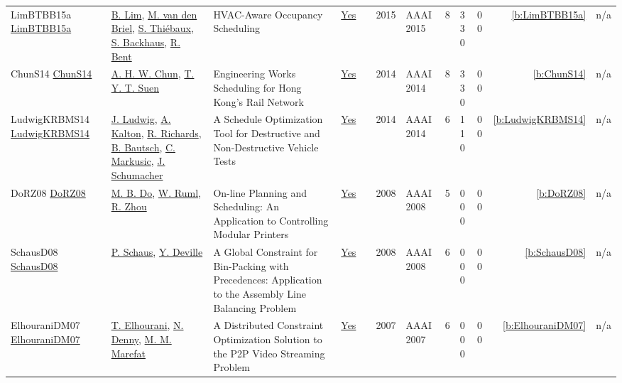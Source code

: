 {\begin{longtable}{>{\raggedright\arraybackslash}p{3cm}>{\raggedright\arraybackslash}p{4.5cm}>{\raggedright\arraybackslash}p{6.0cm}rrrp{2.5cm}rp{1cm}p{1cm}rr}
LimBTBB15a \href{https://doi.org/10.1609/aaai.v29i1.9236}{LimBTBB15a} & \hyperref[auth:a207]{B. Lim}, \hyperref[auth:a210]{M. van den Briel}, \hyperref[auth:a209]{S. Thi{\'{e}}baux}, \hyperref[auth:a1356]{S. Backhaus}, \hyperref[auth:a1355]{R. Bent} & HVAC-Aware Occupancy Scheduling & \href{../works/LimBTBB15a.pdf}{Yes} & \cite{LimBTBB15a} & 2015 & AAAI 2015 & 8 & 3 3 0 & 0 0 & \ref{b:LimBTBB15a} & n/a\\
ChunS14 \href{https://doi.org/10.1609/aaai.v28i2.19013}{ChunS14} & \hyperref[auth:a1323]{A. H. W. Chun}, \hyperref[auth:a1373]{T. Y. T. Suen} & Engineering Works Scheduling for Hong Kong's Rail Network & \href{../works/ChunS14.pdf}{Yes} & \cite{ChunS14} & 2014 & AAAI 2014 & 8 & 3 3 0 & 0 0 & \ref{b:ChunS14} & n/a\\
LudwigKRBMS14 \href{https://doi.org/10.1609/aaai.v28i2.19030}{LudwigKRBMS14} & \hyperref[auth:a1349]{J. Ludwig}, \hyperref[auth:a1350]{A. Kalton}, \hyperref[auth:a1351]{R. Richards}, \hyperref[auth:a1352]{B. Bautsch}, \hyperref[auth:a1353]{C. Markusic}, \hyperref[auth:a1354]{J. Schumacher} & A Schedule Optimization Tool for Destructive and Non-Destructive Vehicle Tests & \href{../works/LudwigKRBMS14.pdf}{Yes} & \cite{LudwigKRBMS14} & 2014 & AAAI 2014 & 6 & 1 1 0 & 0 0 & \ref{b:LudwigKRBMS14} & n/a\\
DoRZ08 \href{http://www.aaai.org/Library/AAAI/2008/aaai08-253.php}{DoRZ08} & \hyperref[auth:a1346]{M. B. Do}, \hyperref[auth:a1347]{W. Ruml}, \hyperref[auth:a1348]{R. Zhou} & On-line Planning and Scheduling: An Application to Controlling Modular Printers & \href{../works/DoRZ08.pdf}{Yes} & \cite{DoRZ08} & 2008 & AAAI 2008 & 5 & 0 0 0 & 0 0 & \ref{b:DoRZ08} & n/a\\
SchausD08 \href{http://www.aaai.org/Library/AAAI/2008/aaai08-058.php}{SchausD08} & \hyperref[auth:a147]{P. Schaus}, \hyperref[auth:a151]{Y. Deville} & A Global Constraint for Bin-Packing with Precedences: Application to the Assembly Line Balancing Problem & \href{../works/SchausD08.pdf}{Yes} & \cite{SchausD08} & 2008 & AAAI 2008 & 6 & 0 0 0 & 0 0 & \ref{b:SchausD08} & n/a\\
ElhouraniDM07 \href{http://www.aaai.org/Library/AAAI/2007/aaai07-213.php}{ElhouraniDM07} & \hyperref[auth:a1343]{T. Elhourani}, \hyperref[auth:a1344]{N. Denny}, \hyperref[auth:a1345]{M. M. Marefat} & A Distributed Constraint Optimization Solution to the {P2P} Video Streaming Problem & \href{../works/ElhouraniDM07.pdf}{Yes} & \cite{ElhouraniDM07} & 2007 & AAAI 2007 & 6 & 0 0 0 & 0 0 & \ref{b:ElhouraniDM07} & n/a\\

\end{longtable}}
